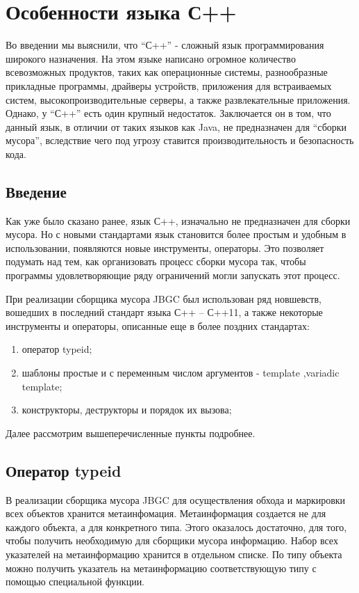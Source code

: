 \section{Особенности языка С++}

 
Во введении мы выяснили, что “С++” - сложный язык программирования широкого назначения. На этом языке написано огромное количество всевозможных продуктов, таких как операционные системы, разнообразные прикладные программы, драйверы устройств, приложения для встраиваемых систем, высокопроизводительные серверы, а также развлекательные приложения.
Однако, у “С++” есть один крупный недостаток. Заключается он в том, что данный язык, в отличии от таких языков как Java, не предназначен для “сборки мусора”, вследствие чего под угрозу ставится производительность и безопасность кода.

\subsection{Введение} 

Как уже было сказано ранее, язык С++, изначально не предназначен для сборки мусора. Но с новыми стандартами язык становится более простым и удобным в использовании, появляются новые инструменты, операторы. Это позволяет подумать над тем, как организовать процесс сборки мусора так, чтобы программы удовлетворяющие ряду ограничений могли запускать этот процесс.

При реализации сборщика мусора JBGC был использован ряд новшевств, вошедших в последний стандарт языка С++ -- С++11, а также некоторые инструменты и операторы, описанные еще в более поздних стандартах: 
\begin{enumerate}
\item оператор typeid;
\item шаблоны простые и с переменным числом аргументов -  template ,variadic template;
\item  конструкторы, деструкторы и порядок их вызова;
\end{enumerate}
Далее рассмотрим вышеперечисленные пункты подробнее.
\subsection{Оператор typeid} 

В реализации сборщика мусора JBGC для осуществления обхода и маркировки всех объектов хранится метаинфомация.  Метаинформация создается не для каждого объекта, а для конкретного типа. Этого оказалось достаточно, для того, чтобы получить необходимую для сборщики мусора информацию. Набор всех указателей на метаинформацию хранится в отдельном списке. По типу объекта можно получить указатель на метаинформацию соответствующую типу с помощью специальной функции.

